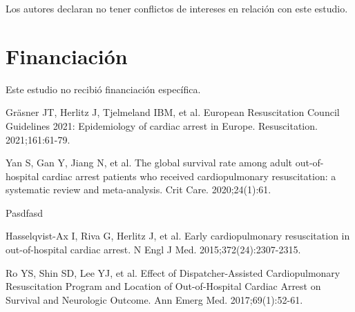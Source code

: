 \documentclass[10pt,a4paper]{article}
\begin{document}
\begin{multicols}{2}
Los autores declaran no tener conflictos de intereses en relación con este estudio.

\section{Financiación}

Este estudio no recibió financiación específica.

\begin{thebibliography}{99}

 Gräsner JT, Herlitz J, Tjelmeland IBM, et al. European Resuscitation Council Guidelines 2021: Epidemiology of cardiac arrest in Europe. Resuscitation. 2021;161:61-79.

 Yan S, Gan Y, Jiang N, et al. The global survival rate among adult out-of-hospital cardiac arrest patients who received cardiopulmonary resuscitation: a systematic review and meta-analysis. Crit Care. 2020;24(1):61.

 Pasdfasd

 Hasselqvist-Ax I, Riva G, Herlitz J, et al. Early cardiopulmonary resuscitation in out-of-hospital cardiac arrest. N Engl J Med. 2015;372(24):2307-2315.

 Ro YS, Shin SD, Lee YJ, et al. Effect of Dispatcher-Assisted Cardiopulmonary Resuscitation Program and Location of Out-of-Hospital Cardiac Arrest on Survival and Neurologic Outcome. Ann Emerg Med. 2017;69(1):52-61.

\end{thebibliography}

\end{multicols}
\end{document}
